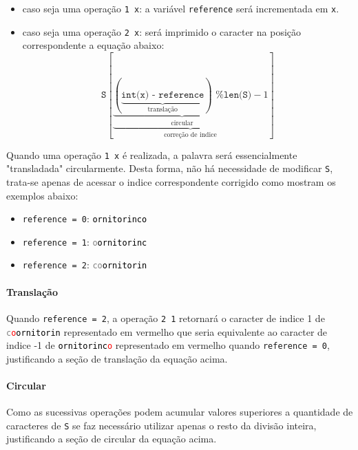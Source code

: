 \documentclass[a4paper]{article}
\begin{document}
\begin{itemize}
    \item caso seja uma operação \texttt{1 x}: a variável \texttt{reference} será incrementada em \texttt{x}.
    \item caso seja uma operação \texttt{2 x}: será imprimido o caracter na posição correspondente a equação abaixo:
    \begin{equation}
        \texttt{S}
        [
            \underbrace{
                \underbrace{
                    (
                        \underbrace{
                            \texttt{int(x) - reference}
                        }_{\text{translação}}
                    ) \texttt{ \% len(S)}
                }_{\text{circular}}
                    - 1
            }_{\text{correção de indice}}
        ]
    \end{equation}
\end{itemize}
Quando uma operação \texttt{1 x} é realizada, a palavra será essencialmente "transladada" circularmente. Desta forma, não há necessidade de modificar \texttt{S}, trata-se apenas de acessar o indice correspondente corrigido como mostram os exemplos abaixo:
\begin{itemize}
    \item \texttt{reference = 0}: \textcolor{black}{\texttt{ornitorinco}}
    \item \texttt{reference = 1}: \textcolor{gray}{\texttt{o}}\textcolor{black}{\texttt{ornitorinc}}
    \item \texttt{reference = 2}: \textcolor{gray}{\texttt{co}}\textcolor{black}{\texttt{ornitorin}}
\end{itemize}

\paragraph{Translação} Quando \texttt{reference = 2}, a operação \texttt{2 1} retornará o caracter de indice 1 de \textcolor{gray}{\texttt{c}}\textcolor{red}{\texttt{o}}\textcolor{black}{\texttt{ornitorin}} representado em vermelho que seria equivalente ao caracter de indice -1 de \textcolor{black}{\texttt{ornitorinc}}\textcolor{red}{\texttt{o}} representado em vermelho quando \texttt{reference = 0}, justificando a seção de translação da equação acima.

\paragraph{Circular} Como as sucessivas operações podem acumular valores superiores a quantidade de caracteres de \texttt{S} se faz necessário utilizar apenas o resto da divisão inteira, justificando a seção de circular da equação acima.
\end{document}
